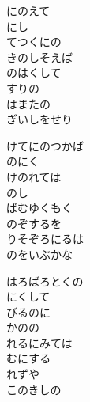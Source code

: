\documentclass[10pt,b5j]{tarticle} %
\begin{document}
\vspace{1.5em} %
\newcommand{\linespace}{0.5em} %
\newcommand{\blocksize}{0.5\hsize} %
\begin{enumerate} %
    \begin{minipage}[c]{\blocksize}
    
        \vspace{\linespace}
        \item
        にのえて\\
        にし\\
        てつくにの\\
        きのしそえば\\
        のはくして\\
        すりの\\
        はまたの\\
        ぎいしをせり
        
        \vspace{\linespace}
        \item
        けてにのつかば\\
        のにく\\
        けのれては\\
        のし\\
        ばむゆくもく\\
        のぞするを\\
        りそぞろにるは\\
        のをいぶかな
        
        \vspace{\linespace}
        \item
        はろばろとくの\\
        にくして\\
        びるのに\\
        かのの\\
        れるにみては\\
        むにする\\
        れずや\\
        このきしの
    
    \end{minipage}
\end{enumerate} %
\end{document}
